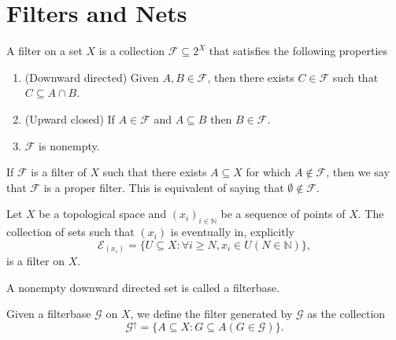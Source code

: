 \section{Filters and Nets}

\begin{definition}\label{def: filter}
  A filter on a set \(X\) is a collection \(\mathcal F \subseteq 2^X\) that
  satisfies the following properties
  \begin{enumerate}[(F1)]
    \item\label{def: filter F1}
      (Downward directed) Given \(A, B \in \mathcal F\), then there exists
      \(C \in \mathcal F\) such that \(C \subseteq A \cap B\).
    \item\label{def: filter F2}
      (Upward closed) If \(A \in \mathcal F\) and \(A \subseteq B\) then \(B
      \in \mathcal F\).
    \item\label{def: filter F3}
      \(\mathcal F\) is nonempty.
  \end{enumerate}
\end{definition}

\begin{definition}
  If \(\mathcal F\) is a filter of \(X\) such that there exists \(A \subseteq
  X\) for which \(A \not\in \mathcal F\), then we say that \(\mathcal F\) is a
  proper filter. This is equivalent of saying that \(\emptyset \not\in \mathcal
  F\).
\end{definition}

\begin{proposition}
  Let \(X\) be a topological space and \({(x_i)}_{i \in \mathbb{N}}\) be a
  sequence of points of \(X\). The collection of sets such that \((x_i)\) is
  eventually in, explicitly
  \[
    \mathcal E_{(x_i)} = \{U \subseteq X : \forall i \geq N, x_i \in U (N \in
    \mathbb{N})\},
  \]
  is a filter on \(X\).
\end{proposition}

\begin{definition}[Filterbase]
  A nonempty downward directed set is called a filterbase.
\end{definition}

\begin{proposition}
  Given a filterbase \(\mathcal G\) on \(X\), we define the filter generated by
  \(\mathcal G\) as the collection
  \[
    \mathcal G^\uparrow = \{A \subseteq X : G \subseteq A (G \in \mathcal G)\}.
  \]
\end{proposition}

